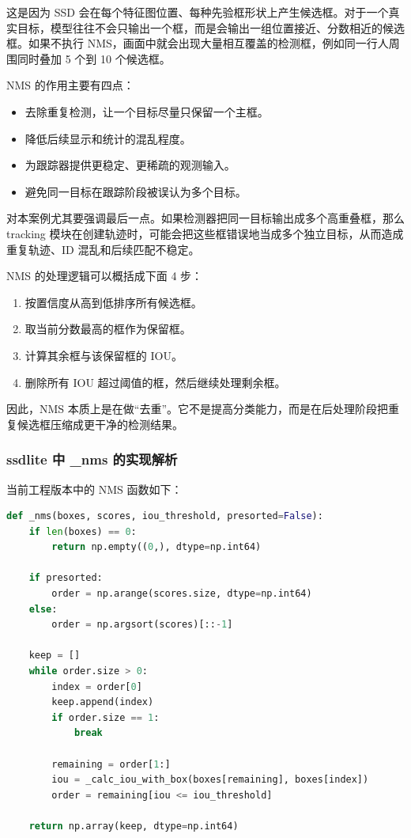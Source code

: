 这是因为 SSD
会在每个特征图位置、每种先验框形状上产生候选框。对于一个真实目标，模型往往不会只输出一个框，而是会输出一组位置接近、分数相近的候选框。如果不执行
NMS，画面中就会出现大量相互覆盖的检测框，例如同一行人周围同时叠加 5 个到
10 个候选框。

NMS 的作用主要有四点：

\begin{itemize}
\tightlist
\item
  去除重复检测，让一个目标尽量只保留一个主框。
\item
  降低后续显示和统计的混乱程度。
\item
  为跟踪器提供更稳定、更稀疏的观测输入。
\item
  避免同一目标在跟踪阶段被误认为多个目标。
\end{itemize}

对本案例尤其要强调最后一点。如果检测器把同一目标输出成多个高重叠框，那么
tracking
模块在创建轨迹时，可能会把这些框错误地当成多个独立目标，从而造成重复轨迹、ID
混乱和后续匹配不稳定。

NMS 的处理逻辑可以概括成下面 4 步：

\begin{enumerate}
\def\labelenumi{\arabic{enumi}.}
\tightlist
\item
  按置信度从高到低排序所有候选框。
\item
  取当前分数最高的框作为保留框。
\item
  计算其余框与该保留框的 IOU。
\item
  删除所有 IOU 超过阈值的框，然后继续处理剩余框。
\end{enumerate}

因此，NMS
本质上是在做``去重''。它不是提高分类能力，而是在后处理阶段把重复候选框压缩成更干净的检测结果。

\subsubsection{ssdlite 中 \_nms
的实现解析}\label{src-experiment-case2-h33}

当前工程版本中的 NMS 函数如下：

\begin{lstlisting}[language=Python]
def _nms(boxes, scores, iou_threshold, presorted=False):
    if len(boxes) == 0:
        return np.empty((0,), dtype=np.int64)

    if presorted:
        order = np.arange(scores.size, dtype=np.int64)
    else:
        order = np.argsort(scores)[::-1]

    keep = []
    while order.size > 0:
        index = order[0]
        keep.append(index)
        if order.size == 1:
            break

        remaining = order[1:]
        iou = _calc_iou_with_box(boxes[remaining], boxes[index])
        order = remaining[iou <= iou_threshold]

    return np.array(keep, dtype=np.int64)
\end{lstlisting}

